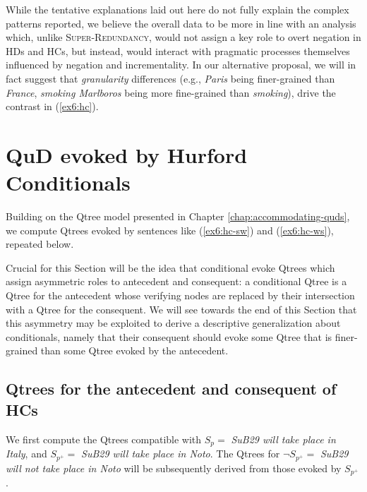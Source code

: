 While the tentative explanations laid out here do not fully explain the complex patterns reported, we believe the overall data to be more in line with an analysis which, unlike \textsc{Super-Redundancy}, would not assign a key role to overt negation in HDs and HCs, but instead, would interact with pragmatic processes themselves influenced by negation and incrementality. In our alternative proposal, we will in fact suggest that \textit{granularity} differences (e.g., \textit{Paris} being finer-grained than \textit{France}, \textit{smoking Marlboros} being more fine-grained than \textit{smoking}), drive the contrast in (\ref{ex6:hc}).



\section{QuD evoked by Hurford Conditionals}\label{sec6:machinery}


Building on the Qtree model presented in Chapter \ref{chap:accommodating-quds}, we compute Qtrees evoked by sentences like (\ref{ex6:hc-sw}) and (\ref{ex6:hc-ws}), repeated below. 

\begin{exe}
	\begin{xlist}
	\end{xlist}
\end{exe}

Crucial for this Section will be the idea that conditional evoke Qtrees which assign asymmetric roles to antecedent and consequent: a conditional Qtree is a Qtree for the antecedent whose verifying nodes are replaced by their intersection with a Qtree for the consequent. We will see towards the end of this Section that this asymmetry may be exploited to derive a descriptive generalization about conditionals, namely that their consequent should evoke some Qtree that is finer-grained than some Qtree evoked by the antecedent. 

\subsection{Qtrees for the antecedent and consequent of HCs}

We first compute the Qtrees compatible with $S_p = $ \textit{SuB29 will take place in Italy}, and $S_{p^+} = $ \textit{SuB29 will take place in Noto}. The Qtrees for $\neg S_{p^+} = $ \textit{SuB29 will not take place in Noto} will be subsequently derived from those evoked by $S_{p^+}$.

